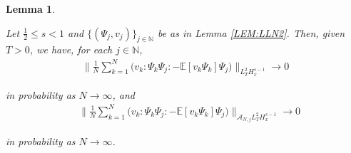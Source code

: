 \documentclass[letterpaper, 11pt,  reqno]{amsart}
\newtheorem{lemma}[theorem]{Lemma}
\newcommand{\1}{\hspace{0.5mm}\text{I}\hspace{0.2mm}}
\newcommand{\noi}{\noindent}
\newcommand{\N}{\mathbb{N}}
\newcommand{\E}{\mathbb{E}}
\newcommand{\A}{\mathcal{A}}
\newcommand{\wick}[1]{:\!{#1}\!:}
\numberwithin{equation}{section}
\numberwithin{theorem}{section}
\begin{document}
\begin{lemma}
\label{LEM:LLN3}

Let $\frac 12  \le s < 1$
and $\{(\Psi_j, v_j)\}_{j \in \N}$ be as in Lemma \ref{LEM:LLN2}.
Then, given $T  > 0$, 
we have, for each $j \in \N$, 
\begin{align}
\bigg\| \frac 1N \sum_{k = 1}^N \Big( v_k\! \wick{\Psi_k \Psi_j} 
- \E [ v_k\Psi_k ] \Psi_j \Big) \bigg\|_{L_T^2 H_x^{s-1}} \longrightarrow 0
\label{LNx1} 
\end{align}


\noi
in probability as $N \to \infty$, 
and
\begin{align}
&\bigg\| \frac 1N \sum_{k = 1}^N \Big( v_k \!\wick{\Psi_k \Psi_j} - \E [v_k\Psi_k ] \Psi_j \Big) 
\bigg\|_{\A_{N, j}L_T^2 H_x^{s-1}} \longrightarrow 0
\label{LNx1a}
\end{align}


\noi
in probability as $N \to \infty$.


\end{lemma}
\end{document}

